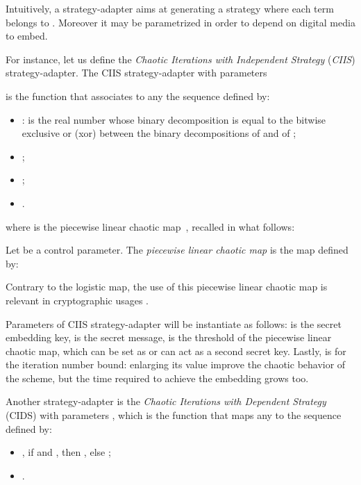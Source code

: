 \documentclass{comjnl}
\begin{document}
Intuitively, a strategy-adapter aims at generating a strategy 
 where each term  belongs to 
. Moreover it may be parametrized
in order to depend on digital media to embed. 

For instance, let us define the  \emph{Chaotic Iterations with Independent Strategy}
(\emph{CIIS}) strategy-adapter.
The CIIS strategy-adapter with parameters 

is the function that associates to any   the sequence
 defined by: 



 \begin{itemize} 
 \item :  is the real number whose binary decomposition is equal to the bitwise exclusive or (xor)
   between the binary decompositions of  and of  ;
 \item ;
 \item ;
 \item .
 \end{itemize}
where  is the
piecewise linear chaotic map~\cite{Shujun1}, 
recalled in what follows:

\begin{definition}
 \label{def:fonction chaotique linéaire par morceaux}
Let  be a control parameter. 
The \emph{piecewise linear chaotic map} is the map 
defined by: 
 
 \end{definition}

Contrary to the logistic map, the use of this piecewise linear chaotic map 
is relevant in cryptographic usages \cite{Arroyo08}.

Parameters of CIIS strategy-adapter will be instantiate as follows: 
 is the secret embedding key,  is the secret message, 
 is the threshold of the piecewise linear chaotic map,
which can be set as  or can act as a second secret key.
Lastly,  is for the iteration number bound:
enlarging its value improve the chaotic behavior of the scheme,
but the time required to achieve the embedding grows too.

Another strategy-adapter is the 
\emph{Chaotic Iterations with Dependent Strategy} (CIDS) 
with parameters , 
which is the function that maps any  to
the sequence  defined by:
\begin{itemize}
\item , if  and , 
  then , else ;
\item .
\end{itemize}
\end{document}
